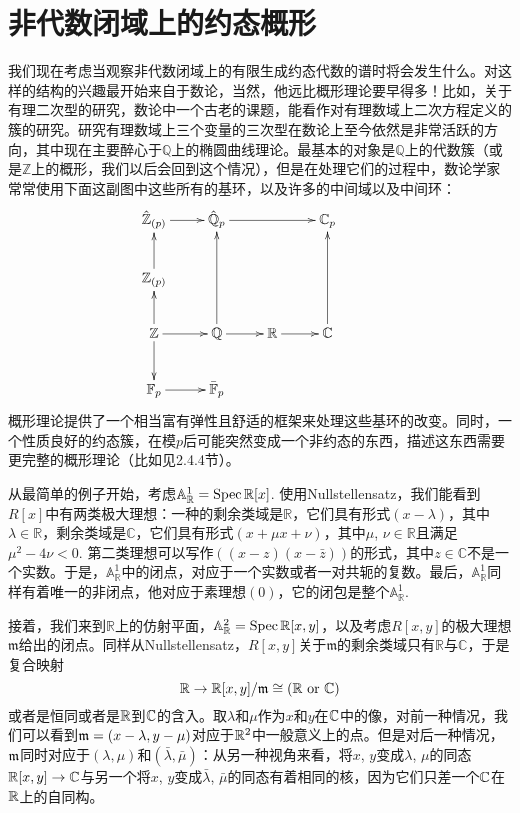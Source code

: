 \section{非代数闭域上的约态概形}

我们现在考虑当观察非代数闭域上的有限生成约态代数的谱时将会发生什么。对这样的结构的兴趣最开始来自于数论，当然，他远比概形理论要早得多！比如，关于有理二次型的研究，数论中一个古老的课题，能看作对有理数域上二次方程定义的簇的研究。研究有理数域上三个变量的三次型在数论上至今依然是非常活跃的方向，其中现在主要醉心于$\mathbb{Q}$上的椭圆曲线理论。最基本的对象是$\mathbb{Q}$上的代数簇（或是$\mathbb{Z}$上的概形，我们以后会回到这个情况），但是在处理它们的过程中，数论学家常常使用下面这副图中这些所有的基环，以及许多的中间域以及中间环：
\[
\begin{xy}
	\xymatrix{
		\hat{\mathbb{Z}}_{(p)}\ar[r]&\hat{\mathbb{Q}}_{p}\ar[rr]&&\mathbb{C}_p\\
		\mathbb{Z}_{(p)}\ar[u]&&&\\
		\mathbb{Z}\ar[u]\ar[r]\ar[d]&\mathbb{Q}\ar[r]\ar[uu]&\mathbb{R}\ar[r]&\mathbb{C}\ar[uu]\\
		\mathbb{F}_p\ar[r]&\bar{\mathbb{F}}_p&&&
	}
\end{xy}
\]
概形理论提供了一个相当富有弹性且舒适的框架来处理这些基环的改变。同时，一个性质良好的约态簇，在模$p$后可能突然变成一个非约态的东西，描述这东西需要更完整的概形理论（比如见2.4.4节）。

从最简单的例子开始，考虑$\mathbb{A}_{\mathbb{R}}^1=\operatorname{Spec} \mathbb{R}[x]$. 使用Nullstellensatz，我们能看到$R[x]$中有两类极大理想：一种的剩余类域是$\mathbb{R}$，它们具有形式$(x-\lambda)$，其中$\lambda\in\mathbb{R}$，剩余类域是$\mathbb{C}$，它们具有形式$(x+\mu x+\nu)$，其中$\mu$, $\nu\in\mathbb{R}$且满足$\mu^2-4\nu<0$. 第二类理想可以写作$((x-z)(x-\bar{z}))$的形式，其中$z\in \mathbb{C}$不是一个实数。于是，$\mathbb{A}_{\mathbb{R}}^1$中的闭点，对应于一个实数或者一对共轭的复数。最后，$\mathbb{A}_{\mathbb{R}}^1$同样有着唯一的非闭点，他对应于素理想$(0)$，它的闭包是整个$\mathbb{A}_{\mathbb{R}}^1$.

接着，我们来到$\mathbb{R}$上的仿射平面，$\mathbb{A}_{\mathbb{R}}^2=\operatorname{Spec} \mathbb{R}[x,y]$，以及考虑$R[x,y]$的极大理想$\mathfrak{m}$给出的闭点。同样从Nullstellensatz，$R[x,y]$关于$\mathfrak{m}$的剩余类域只有$\mathbb{R}$与$\mathbb{C}$，于是复合映射
\[
	\mathbb{R}\to \mathbb{R}[x,y]/\mathfrak{m}\cong (\mathbb{R} \text{ or } \mathbb{C})
\]
或者是恒同或者是$\mathbb{R}$到$\mathbb{C}$的含入。取$\lambda$和$\mu$作为$x$和$y$在$\mathbb{C}$中的像，对前一种情况，我们可以看到$\mathfrak{m}=(x-\lambda,y-\mu)$对应于$\mathbb{R}^2$中一般意义上的点。但是对后一种情况，$\mathfrak{m}$同时对应于$(\lambda,\mu)$和$(\bar\lambda,\bar\mu)$：从另一种视角来看，将$x$, $y$变成$\lambda$, $\mu$的同态$\mathbb{R}[x,y]\to \mathbb{C}$与另一个将$x$, $y$变成$\bar\lambda$, $\bar\mu$的同态有着相同的核，因为它们只差一个$\mathbb{C}$在$\mathbb{R}$上的自同构。

